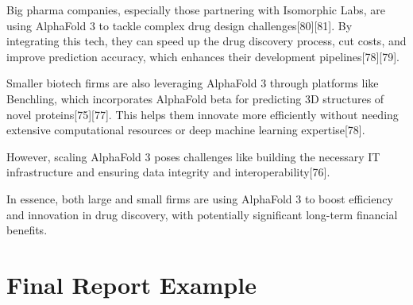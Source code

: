 \documentclass[11pt]{article}
\begin{document}
\begin{showcase}[title=Topic: AlphaFold 3]
Big pharma companies, especially those partnering with Isomorphic Labs, are using AlphaFold 3 to tackle complex drug design challenges[80][81]. By integrating this tech, they can speed up the drug discovery process, cut costs, and improve prediction accuracy, which enhances their development pipelines[78][79].

Smaller biotech firms are also leveraging AlphaFold 3 through platforms like Benchling, which incorporates AlphaFold beta for predicting 3D structures of novel proteins[75][77]. This helps them innovate more efficiently without needing extensive computational resources or deep machine learning expertise[78].

However, scaling AlphaFold 3 poses challenges like building the necessary IT infrastructure and ensuring data integrity and interoperability[76].

In essence, both large and small firms are using AlphaFold 3 to boost efficiency and innovation in drug discovery, with potentially significant long-term financial benefits.
\end{showcase}


\newpage
\section{Final Report Example}
\label{sec:alphafold_report}
\renewcommand{\arraystretch}{1.5} %
\end{document}

